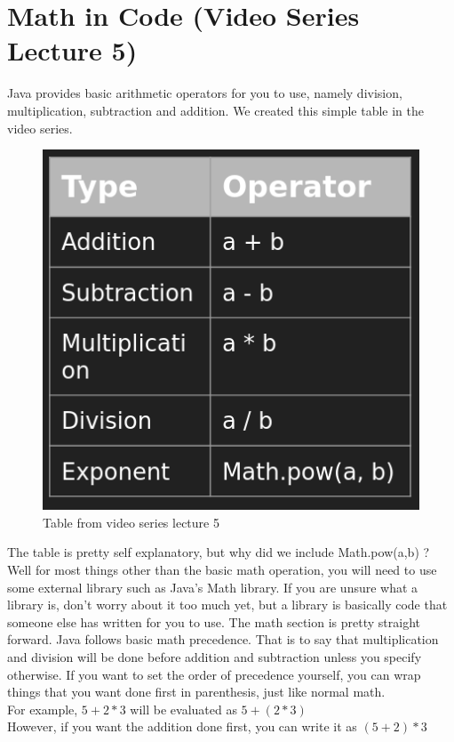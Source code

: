 \documentclass[11]{article}
\begin{document}
\section{Math in Code (Video Series Lecture 5)}
Java provides basic arithmetic operators for you to use, namely division, multiplication, subtraction and addition. We created this simple table in the video series.
\begin{figure}[H]
	\centering
	\includegraphics[scale=0.5]{math1.png}
	\caption{Table from video series lecture 5}
\end{figure}

The table is pretty self explanatory, but why did we include Math.pow(a,b) ? Well for most things other than the basic math operation, you will need to use some external library such as Java's Math library. If you are unsure what a library is, don't worry about it too much yet, but a library is basically code that someone else has written for you to use. The math section is pretty straight forward. Java follows basic math precedence. That is to say that multiplication and division will be done before addition and subtraction unless you specify otherwise. If you want to set the order of precedence yourself, you can wrap things that you want done first in parenthesis, just like normal math.\\

For example, $5 + 2 * 3$ will be evaluated as $5 + (2 * 3)$ \\
However, if you want the addition done first, you can write it as $(5 + 2) * 3$\\
\end{document}

